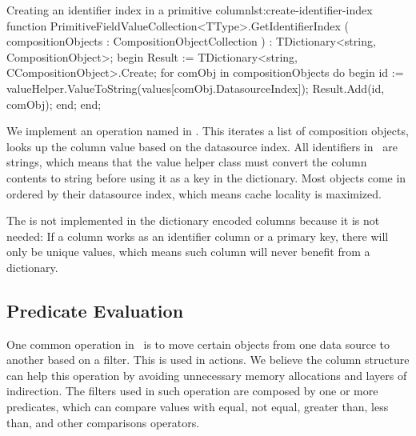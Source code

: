 \begin{delphicode}{Creating an identifier index in a primitive column}{lst:create-identifier-index}
function PrimitiveFieldValueCollection<TType>.GetIdentifierIndex
( compositionObjects : CompositionObjectCollection )
: TDictionary<string, CompositionObject>;
begin
  Result := TDictionary<string, CCompositionObject>.Create;
  for comObj in compositionObjects do
  begin
    id := valueHelper.ValueToString(values[comObj.DatasourceIndex]);
    Result.Add(id, comObj);
  end;
end;
\end{delphicode}
We implement an operation named  in . This iterates a list of composition objects, looks up the column value based on the datasource index. All identifiers in \gap~are strings, which means that the value helper class must convert the column contents to string before using it as a key in the dictionary. Most objects come in ordered by their datasource index, which means cache locality is maximized.

The  is not implemented in the dictionary encoded columns because it is not needed: If a column works as an identifier column or a primary key, there will only be unique values, which means such column will never benefit from a dictionary.

\subsection{Predicate Evaluation}
\label{sub:Predicate Evaluation}
One common operation in \gap~is to move certain objects from one data source to another based on a filter. This is used in actions. We believe the column structure can help this operation by avoiding unnecessary memory allocations and layers of indirection. The filters used in such operation are composed by one or more predicates, which can compare values with equal, not equal, greater than, less than, and other comparisons operators. 


